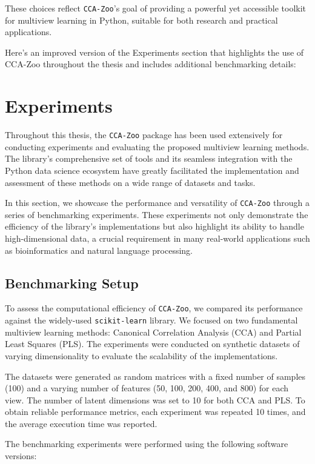 These choices reflect \texttt{CCA-Zoo}'s goal of providing a powerful yet accessible toolkit for multiview learning in Python, suitable for both research and practical applications.

Here's an improved version of the Experiments section that highlights the use of CCA-Zoo throughout the thesis and includes additional benchmarking details:

\section{Experiments}

Throughout this thesis, the \texttt{CCA-Zoo} package has been used extensively for conducting experiments and evaluating the proposed multiview learning methods. The library's comprehensive set of tools and its seamless integration with the Python data science ecosystem have greatly facilitated the implementation and assessment of these methods on a wide range of datasets and tasks.

In this section, we showcase the performance and versatility of \texttt{CCA-Zoo} through a series of benchmarking experiments. These experiments not only demonstrate the efficiency of the library's implementations but also highlight its ability to handle high-dimensional data, a crucial requirement in many real-world applications such as bioinformatics and natural language processing.

\subsection{Benchmarking Setup}

To assess the computational efficiency of \texttt{CCA-Zoo}, we compared its performance against the widely-used \texttt{scikit-learn} library. We focused on two fundamental multiview learning methods: Canonical Correlation Analysis (CCA) and Partial Least Squares (PLS). The experiments were conducted on synthetic datasets of varying dimensionality to evaluate the scalability of the implementations.

The datasets were generated as random matrices with a fixed number of samples (100) and a varying number of features (50, 100, 200, 400, and 800) for each view. The number of latent dimensions was set to 10 for both CCA and PLS. To obtain reliable performance metrics, each experiment was repeated 10 times, and the average execution time was reported.

The benchmarking experiments were performed using the following software versions:

